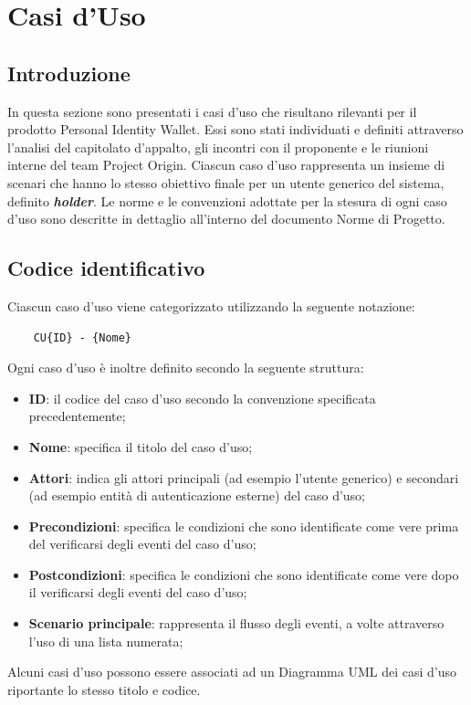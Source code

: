 \section{Casi d'Uso}
\subsection{Introduzione}
In questa sezione sono presentati i casi d'uso che risultano rilevanti per il prodotto Personal Identity Wallet. 
Essi sono stati individuati e definiti attraverso l'analisi del capitolato d'appalto, gli incontri con il proponente e le riunioni interne del team Project Origin.
Ciascun caso d'uso rappresenta un insieme di scenari che hanno lo stesso obiettivo finale per un utente generico del sistema, definito \textbf{\textit{holder}}.
Le norme e le convenzioni adottate per la stesura di ogni caso d'uso sono descritte in dettaglio all'interno del documento Norme di Progetto.
 \subsection{Codice identificativo}
Ciascun caso d'uso viene categorizzato utilizzando la seguente notazione:
\begin{center}\begin{verbatim}
    CU{ID} - {Nome}
\end{verbatim}\end{center}
Ogni caso d’uso è inoltre definito secondo la seguente struttura:
\begin{itemize}
    \item \textbf{ID}: il codice del caso d’uso secondo la convenzione specificata precedentemente;
    \item \textbf{Nome}:  specifica il titolo del caso d’uso;
    \item \textbf{Attori}:  indica gli attori principali (ad esempio l’utente generico) e secondari (ad esempio entità di autenticazione esterne) del caso d’uso;
    \item \textbf{Precondizioni}:  specifica le condizioni che sono identificate come vere prima del verificarsi degli eventi del caso d’uso;
    \item \textbf{Postcondizioni}:  specifica  le  condizioni  che  sono  identificate  come  vere  dopo  il verificarsi degli eventi del caso d’uso;
    \item \textbf{Scenario  principale}:  rappresenta  il  flusso  degli  eventi,  a  volte  attraverso  l'uso di  una  lista  numerata;
\end{itemize}
Alcuni  casi  d’uso  possono  essere  associati  ad  un Diagramma UML  dei  casi  d'uso riportante lo stesso titolo e codice.
